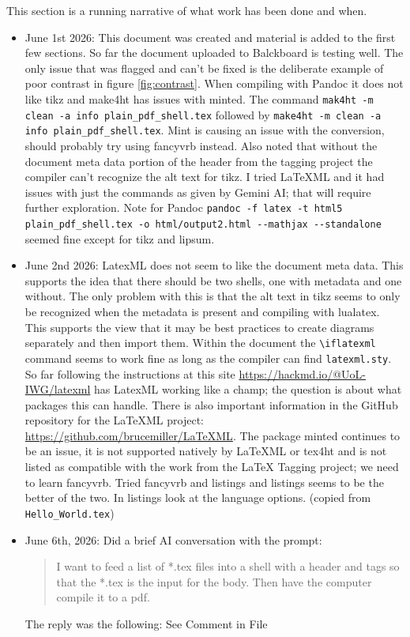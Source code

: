 This section is a running narrative of what work has been done and when.
\begin{itemize}
    \item June 1st 2026: This document was created and material is added to the first few sections.  So far the document uploaded to Balckboard is testing well.  The only issue that was flagged and can't be fixed is the deliberate example of poor contrast in figure \ref{fig:contrast}.  When compiling with Pandoc it does not like tikz and make4ht has issues with minted.  The command \texttt{mak4ht -m clean -a info plain_pdf_shell.tex} followed by \texttt{make4ht -m clean -a info plain_pdf_shell.tex}.  Mint is causing an issue with the conversion, should probably try using fancyvrb instead.  Also noted that without the document meta data portion of the header from the tagging project the compiler can't recognize the alt text for tikz.  I tried \LaTeX ML and it had issues with just the commands as given by Gemini AI; that will require further exploration.  Note for Pandoc \verb|pandoc -f latex -t html5 plain_pdf_shell.tex -o html/output2.html --mathjax --standalone| seemed fine except for tikz and lipsum.
    \item June 2nd 2026: LatexML does not seem to like the document meta data.  This supports the idea that there should be two shells, one with metadata and one without.  The only problem with this is that the alt text in tikz seems to only be recognized when the metadata is present and compiling with lualatex.  This supports the view that it may be best practices to create diagrams separately and then import them.  Within the document the \verb|\iflatexml| command seems to work fine as long as the compiler can find \verb|latexml.sty|.  So far following the instructions at this site \url{https://hackmd.io/@UoL-IWG/latexml} has LatexML working like a champ; the question is about what packages this can handle.  There is also important information in the GitHub repository for the \LaTeX ML project: \url{https://github.com/brucemiller/LaTeXML}.  The package minted continues to be an issue, it is not supported natively by \LaTeX ML or tex4ht and is not listed as compatible with the work from the \LaTeX\/ Tagging project; we need to learn fancyvrb.  Tried fancyvrb and listings and listings seems to be the better of the two.  In listings look at the language options. (copied from \verb|Hello_World.tex|)
    \item June 6th, 2026: Did a brief AI conversation with the prompt:
    \begin{quote}
        I want to feed a list of *.tex files into a shell with a header and \verb|| \verb|| tags so that the *.tex is the input for the body.  Then have the computer compile it to a pdf.
    \end{quote}
    The reply was the following: See Comment in File


\end{itemize}
